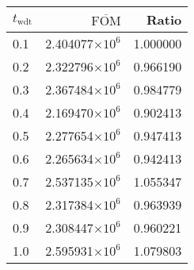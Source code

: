 \begin{tabular}{lrr}
\toprule
$t_{\mathrm{wdt}}$ & $\overline{\mathrm{FOM}}$ &    Ratio \\
\midrule
               0.1 &   2.404077$\times 10^{6}$ & 1.000000 \\
               0.2 &   2.322796$\times 10^{6}$ & 0.966190 \\
               0.3 &   2.367484$\times 10^{6}$ & 0.984779 \\
               0.4 &   2.169470$\times 10^{6}$ & 0.902413 \\
               0.5 &   2.277654$\times 10^{6}$ & 0.947413 \\
               0.6 &   2.265634$\times 10^{6}$ & 0.942413 \\
               0.7 &   2.537135$\times 10^{6}$ & 1.055347 \\
               0.8 &   2.317384$\times 10^{6}$ & 0.963939 \\
               0.9 &   2.308447$\times 10^{6}$ & 0.960221 \\
               1.0 &   2.595931$\times 10^{6}$ & 1.079803 \\
\bottomrule
\end{tabular}
